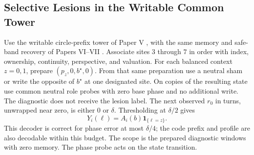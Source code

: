 \documentclass[11pt,a4paper]{article}
\theoremstyle{definition}
\begin{document}
\subsection{Selective Lesions in the Writable Common Tower}

Use the writable circle-prefix tower of Paper V \cite{paper5}, with the same memory and safe-band recovery of Papers VI--VII \cite{paper6,paper7}. Associate sites $3$ through $7$ in order with index, ownership, continuity, perspective, and valuation. For each balanced context $z=0,1$, prepare $(p_z,0,b^\star,0)$. From that same preparation use a neutral sham or write the opposite of $b^\star$ at one designated site. On copies of the resulting state use common neutral role probes with zero base phase and no additional write. The diagnostic does not receive the lesion label. The next observed $r_0$ in turns, unwrapped near zero, is either $0$ or $\delta$. Thresholding at $\delta/2$ gives
\[
 Y_i(\ell)=A_i(b)\mathbf 1_{\{\ell=z\}}.
\]
This decoder is correct for phase error at most $\delta/4$; the code prefix and profile are also decodable within this budget. The scope is the prepared diagnostic windows with zero memory. The phase probe acts on the state transition.
\end{document}
